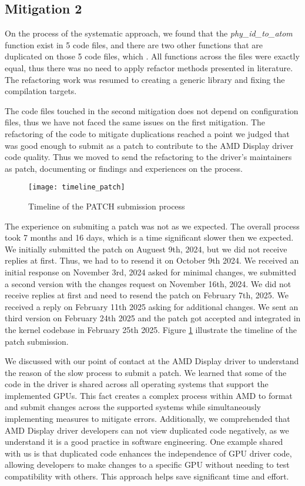 \subsection{Mitigation 2}

On the process of the systematic approach, we found that the \textit{phy\_id\_to\_atom} function exist in 5 code files, and 
there are two other functions that are duplicated on those 5 code files, which . All functions across the files were
exactly equal, thus there was no need to apply refactor methods presented in literature. The refactoring work was resumed
to creating a generic library and fixing the compilation targets. 

The code files touched in the second mitigation does 
not depend on configuration files, thus we have not faced the same issues on the first mitigation. 
The refactoring of the code to mitigate duplications reached a point we judged that was good enough to submit as a patch
to contribute to the AMD Display driver code quality. Thus we moved to send the refactoring to the driver's maintainers 
as patch, documenting or findings and experiences on the process.

\begin{figure}
\texttt{[image: timeline\_patch]}
\caption{Timeline of the PATCH submission process}
\label{fig:timeline}
\end{figure}

The experience on submiting a patch was not as we expected.
The overall process took 7 months and 16 days, which is a time significant slower then we expected.
We initially submitted the patch on Auguest 9th, 2024, but we did not receive replies at first. Thus, we had
to to resend it on October 9th 2024. We received an initial response on November 3rd, 2024 asked for minimal changes, 
we submitted a second version with the changes request on November 16th, 2024. We did not receive replies
at first and need to resend the patch on February 7th, 2025. 
We received a reply on February 11th 2025 asking for additional changes. 
We sent an third version on February 24th 2025 and the patch got accepted and integrated in the kernel codebase in 
February 25th 2025. Figure \ref{fig:timeline} illustrate the timeline of the patch submission.

We discussed with our point of contact at the AMD Display driver to understand the reason of the slow process
to submit a patch. 
We learned that some of the code in the driver is shared across all operating systems that 
support the implemented GPUs. 
This fact creates a complex process within AMD to format and submit changes across the supported systems while 
simultaneously implementing measures to mitigate errors.
Additionally, we comprehended that AMD Display driver developers can not view duplicated code negatively, 
as we understand it is a good practice in software engineering. One example shared with us is that duplicated 
code enhances the independence of GPU driver code, allowing developers to make changes to a specific GPU without 
needing to test compatibility with others. This approach helps save significant time and effort. 

